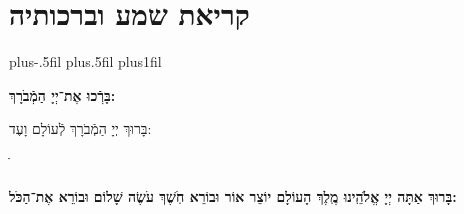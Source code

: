 \documentclass[twoside, openany, parskip=half, 11pt]{book}
\begin{document}
\chapter[שחרית לחול]{קריאת שמע וברכותיה}
\newcommand{\barachu}{
\begin{minipage}{0.8\textwidth}
\leftskip=0pt plus-.5fil
\rightskip=0pt plus.5fil
\parfillskip=0pt plus1fil
\begin{large}

\shatz
\begin{Large}\textbf{בָּרְֿכוּ אֶת־יְיָ הַמְֿבֹרָךְ:}\end{Large}
\end{large}

\vspace{12pt}

\shatzvkahal
בָּרוּךְ יְיָ הַמְֿבֹרָךְ לְֿעוֹלָם וָעֶד:
\end{minipage}
ֺֺ%

%
}


\barachu

\textbf{
בָּרוּךְ אַתָּה יְיָ אֱלֹהֵֽינוּ מֶֽלֶךְ הָעוֹלָם יוֹצֵר אוֹר וּבוֹרֵא חֹֽשֶׁךְ עֹשֶׂה שָׁלוֹם וּבוֹרֵא אֶת־הַכֹּל:
}

\newcommand{\hameir}{
\firstword{הַמֵּאִיר}
לָאָֽרֶץ וְֿלַדָּרִים עָלֶֽיהָ בְּֿרַחֲמִים וּבְטוּבוֹ מְֿחַדֵּשׁ בְּֿכׇל־יוֹם תָּמִיד מַעֲשֵׂה בְֿרֵאשִׁית: \source{תהלים קד}מָה־רַבּ֬וּ מַעֲשֶׂ֨יךָ ׀ יְיָ֗ כֻּ֭לָּם בְּֿחׇכְמָ֣ה עָשִׂ֑יתָ מָלְֿאָ֥ה הָ֝אָ֗רֶץ קִנְיָנֶֽךָ׃ הַמֶּֽלֶךְ הַמְֿרוֹמָם לְֿבַדּוֹ מֵאָז הַמְֿשֻׁבָּח וְֿהַמְֿפֹאָר וְֿהַמִּתְנַשֵּׂא מִימוֹת עוֹלָם: אֱלֹהֵי עוֹלָם בְּֿרַחֲמֶיךָ הָרַבִּים רַחֵם עָלֵינוּ אֲדוֹן עֻזֵּֽנוּ צוּר מִשְׂגַּבֵּנוּ מָגֵן יִשְׁעֵֽנוּ מִשְׂגָּב בַּעֲדֵֽנוּ: אֵ֗ל בָּ֗רוּךְ גְּֿ֗דוֹל דֵּ֗עָה הֵ֗כִין וּ֗פָעַל זׇ֗הֳרֵי חַ֗מָּה ט֗וֹב יָ֗צַר כָּ֗בוֹד לִ֗שְׁמוֹ מְֿ֗אוֹרוֹת נָ֗תַן סְֿ֗בִיבוֹת עֻ֗זּוֹ פִּ֗נּוֹת צְֿ֗בָאָיו קְֿ֗דוֹשִׁים ר֗וֹמֲמֵי שַׁ֗דַּי תָּ֗מִיד מְֿסַפְּֿרִים כְּֿבוֹד־אֵל וּקְדֻשָׁתוֹ: תִּתְבָּרַךְ יְיָ אֱלֹהֵֽינוּ עַל־שֶׁבַח מַעֲשֵׂי יָדֶֽיךָ וְֿעַל־מְֿאֽוֹרֵי אוֹר שֶׁעָשִֽׂיתָ יְֿפָאֲרֽוּךָ סֶּֽלָה:
}
\end{document}
